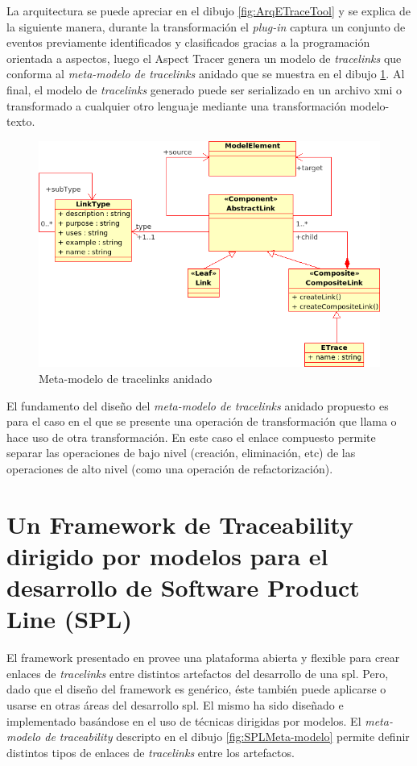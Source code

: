 \documentclass[a4paper,12pt,oneside,spanish]{book}
\begin{document}
La arquitectura se puede apreciar en el dibujo \ref{fig:ArqETraceTool} y se explica de la siguiente manera, durante la transformación el \textit{plug-in} captura un conjunto de eventos previamente identificados y clasificados gracias a la programación orientada a aspectos, luego el \textsf{Aspect Tracer} genera un modelo de \textit{tracelinks} que conforma al \textit{meta-modelo de tracelinks} anidado que se muestra en el dibujo \ref{fig:ETraceToolMeta-modelo}. Al final, el modelo de \textit{tracelinks} generado puede ser serializado en un archivo \gls{xmi} o transformado a cualquier otro lenguaje mediante una transformación modelo-texto.

\begin{figure}[hbtp]
\centering
\includegraphics[scale=0.6]{./img/NestedTraceMetamodel}
\caption{Meta-modelo de tracelinks anidado}
\label{fig:ETraceToolMeta-modelo}
\end{figure}

El fundamento del diseño del \textit{meta-modelo de tracelinks} anidado propuesto es para el caso en el que se presente una operación de transformación que llama o hace uso de otra transformación. En este caso el enlace compuesto permite separar las operaciones de bajo nivel (creación, eliminación, etc) de las operaciones de alto nivel (como una operación de refactorización).

\section{Un Framework de Traceability dirigido por modelos para el desarrollo de Software Product Line (SPL)}

El framework presentado en \cite{SousaKuleszaRummlerAnquetilMitschkeMoreiraAmaralAraujo} provee una plataforma abierta y flexible para crear enlaces de \textit{tracelinks} entre distintos artefactos del desarrollo de una \gls{spl}. Pero, dado que el diseño del framework es genérico, éste también puede aplicarse o usarse en otras áreas del desarrollo \gls{spl}. El mismo ha sido diseñado e implementado basándose en el uso de técnicas dirigidas por modelos. El \textit{meta-modelo de traceability} descripto en el dibujo \ref{fig:SPLMeta-modelo} permite definir distintos tipos de enlaces de \textit{tracelinks} entre los artefactos.
\end{document}
